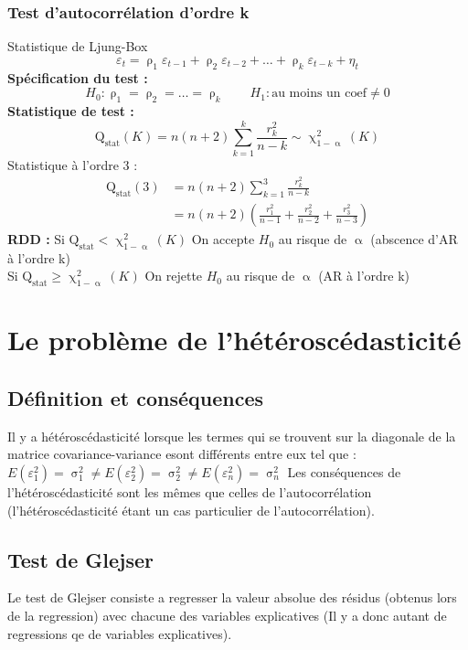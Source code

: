 \documentclass{article}
\begin{document}
\subsubsection{Test d'autocorrélation d'ordre k}
Statistique de Ljung-Box
\begin{equation*}
		\varepsilon_t = \uprho_1 \varepsilon_{t-1} +  \uprho_2 \varepsilon_{t-2} + \ldots +  \uprho_k \varepsilon_{t-k} + \eta_t
\end{equation*}
\textbf{Spécification du test :}
\begin{equation*}
		H_0 : \uprho_1=\uprho_2=\ldots=\uprho_k \qquad H_1 : \text{au moins un coef} \neq 0
\end{equation*}
\textbf{Statistique de test :}
\begin{equation*}
	\text{Q}_{\text{stat}}(K) = n(n+2) \sum_{k = 1}^{k} \frac{r_k^2}{n-k} \sim \upchi^2_{1-\upalpha} (K)
\end{equation*}
{\color{ForestGreen}Statistique à l'ordre 3 :
\begin{equation*}
		\begin{split}
				\text{Q}_{\text{stat}}(3) &= n(n+2) \sum_{k = 1}^{3} \frac{r_k^2}{n-k} \\
										  &= n(n+2) \left( \frac{r_1^2}{n-1} + \frac{r_2^2}{n-2} + \frac{r_3^2}{n-3} \right) 
		\end{split}
\end{equation*}}
\textbf{RDD :}
Si $\text{Q}_{\text{stat}} < \upchi^2_{1-\upalpha} (K)$ On accepte $H_0$ au risque de $\upalpha$ (abscence d'AR à l'ordre k)\\
Si $\text{Q}_{\text{stat}} \geq  \upchi^2_{1-\upalpha} (K)$ On rejette $H_0$ au risque de $\upalpha$ (AR à l'ordre k)
\section{Le problème de l'hétéroscédasticité}
\subsection{Définition et conséquences}
Il y a hétéroscédasticité lorsque les termes qui se trouvent sur la diagonale de la matrice covariance-variance esont différents entre eux tel que : 
$E(\varepsilon_1^2)=\upsigma_1^2 \neq E(\varepsilon_2^2)=\upsigma_2^2 \neq E(\varepsilon_n^2)=\upsigma_n^2$
Les conséquences de l'hétéroscédasticité sont les mêmes que celles de l'autocorrélation (l'hétéroscédasticité étant un cas particulier de l'autocorrélation).
\subsection{Test de Glejser}
Le test de Glejser consiste a regresser la valeur absolue des résidus (obtenus lors de la regression) avec chacune des variables explicatives (Il y a donc autant de regressions qe de variables explicatives).
\end{document}

